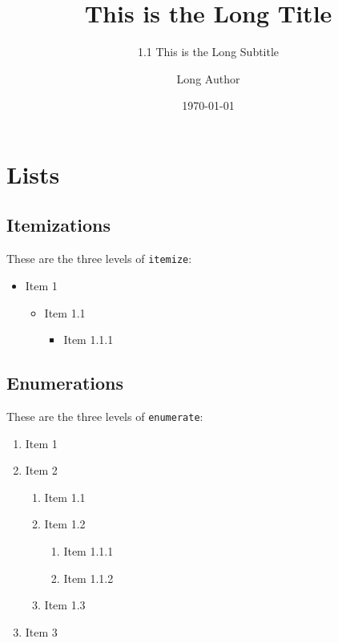 \documentclass[aspectratio=169]{beamer} %
\title[Short Title]{This is the Long Title}
\subtitle[1.1 Short Subtitle]{1.1 This is the Long Subtitle}
\author[Short Author]{Long Author}
\date{\today}
\begin{document}
    
    \maketitle[titleimage][250]

    \section{Lists}

    \subsection{Itemizations}

    \begin{frame}{\insertsubsection}
        These are the three levels of \texttt{itemize}:
        \begin{itemize}
            \item Item 1
            \begin{itemize}
                \item Item 1.1
                \begin{itemize}
                    \item Item 1.1.1
                \end{itemize}
            \end{itemize}
        \end{itemize}
    \end{frame}

    \subsection{Enumerations}

    \begin{frame}{\insertsubsection}
        These are the three levels of \texttt{enumerate}:
        \begin{enumerate}
            \item Item 1
            \item Item 2
            \begin{enumerate}
                \item Item 1.1
                \item Item 1.2
                \begin{enumerate}
                    \item Item 1.1.1
                    \item Item 1.1.2
                \end{enumerate}
                \item Item 1.3
            \end{enumerate}
            \item Item 3
        \end{enumerate}
    \end{frame}
\end{document}
